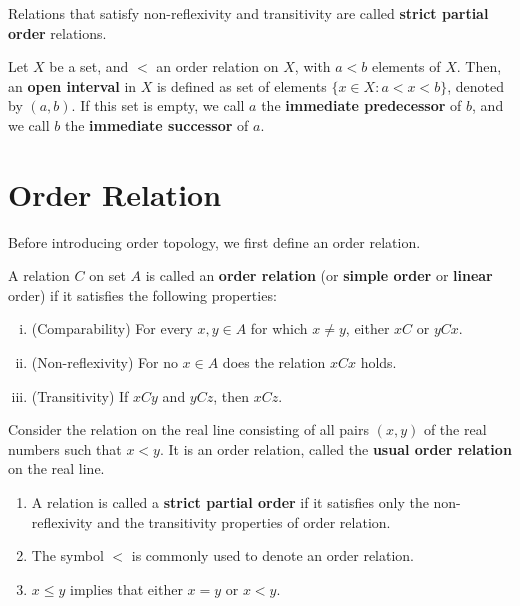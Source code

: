 \documentclass[a4paper,english,12pt]{article}
\begin{document}
\begin{defn} Relations that satisfy non-reflexivity and  transitivity are called \textbf{strict partial order} relations.
\end{defn}
\begin{defn} Let $X$ be a set, and $<$ an order relation on $X$, with $a < b$ elements of $X$. Then, an \textbf{open interval} in $X$ is defined as set of elements $\{x \in X : a < x < b\}$, denoted by $(a, b)$. If this set is empty, we call $a$ the \textbf{immediate predecessor} of $b$, and we call $b$ the \textbf{immediate successor} of $a$.
\end{defn}

\section{Order Relation}  

Before introducing order topology, we first define an order relation.
\begin{defn}
A relation $C$ on set $A$ is called an \textbf{order relation} (or  \textbf{simple order} or \textbf{linear} order) if it satisfies the following properties:
\begin{enumerate}[i)]
\item (Comparability) For every $x, y \in A$ for which $x \neq y$, either $x C$ or $y C x$.
\item (Non-reflexivity) For no $x \in A$ does the relation $x C x$ holds.
\item (Transitivity) If $x C y$ and $y C z$, then $x C z$.
\end{enumerate}
\end{defn}

\begin{exmp}
Consider the relation on the real line consisting of all pairs $(x, y)$ of the real numbers such that $x < y$. It is an order relation, called the \textbf{usual order relation} on the real line.
\end{exmp}


\begin{rem}
\begin{enumerate}
\item A relation is called a \textbf{strict partial order} if it satisfies only the non-reflexivity and the transitivity properties of order relation.    
\item The symbol $<$ is commonly used to denote an order relation.
\item $x \le y$ implies that either $x = y$ or $x < y$. 
\end{enumerate}
\end{rem}
\end{document}
